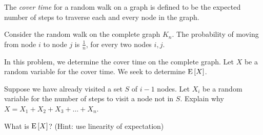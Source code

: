 \documentclass[11pt]{article}
\begin{document}
\begin{problem}
  The \emph{cover time} for a random walk on a graph is defined to be
  the expected number of steps to traverse each and every node in the
  graph.
  
  Consider the random walk on the complete graph $K_n$.  The
  probability of moving from node $i$ to node $j$ is $\frac{1}{n}$,
  for every two nodes $i,j$.
  
  In this problem, we determine the cover time on the complete graph.
  Let $X$ be a random variable for the cover time.  We seek to
  determine $\mathop{\textup{E}}\nolimits\left[X\right]$.
  
  \bparts
  
  \ppart Suppose we have already visited a set $S$ of $i-1$ nodes.
  Let $X_i$ be a random variable for the number of steps to visit a
  node not in $S$.  Explain why $X = X_1 + X_2 + X_3 + \ldots + X_n$.
  

  \ppart What is $\mathop{\textup{E}}\nolimits\left[X\right]$? (Hint: use linearity of expectation)

  
  \eparts
  
\end{problem}
\end{document}
